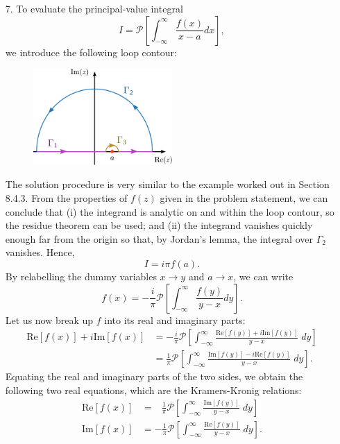 \documentclass[10pt,a4paper]{article}
\begin{document}
\begin{enumerate}
\item[7.]
To evaluate the principal-value integral
\begin{equation}
  I = \mathcal{P}\left[\int_{-\infty}^\infty \frac{f(x)}{x-a} dx \right],
\end{equation}
we introduce the following loop contour:

\begin{figure}[ht]
  \centering\includegraphics[width=0.5\textwidth]{principal_value_integral2}
\end{figure}

The solution procedure is very similar to the example worked out in
Section 8.4.3. From the properties of $f(z)$ given in the problem
statement, we can conclude that (i) the integrand is analytic on and
within the loop contour, so the residue theorem can be used; and (ii)
the integrand vanishes quickly enough far from the origin so that, by
Jordan's lemma, the integral over $\Gamma_2$ vanishes. Hence,
\begin{equation}
  I = i \pi f(a).
\end{equation}
 By relabelling the dummy variables
$x \rightarrow y$ and $a \rightarrow x$, we can write
\begin{equation}
  f(x) = -\frac{i}{\pi} \mathcal{P}\left[\int_{-\infty}^\infty \frac{f(y)}{y-x} dy \right].
\end{equation}
Let us now break up $f$ into its real and imaginary parts:
\begin{align}
  \mathrm{Re}[f(x)] + i \mathrm{Im}[f(x)]
  &= -\frac{i}{\pi} \mathcal{P}\left[\int_{-\infty}^\infty \frac{\mathrm{Re}[f(y)] + i \mathrm{Im}[f(y)]}{y-x} \;dy \right] \\
  &= \frac{1}{\pi} \mathcal{P}\left[\int_{-\infty}^\infty \frac{\mathrm{Im}[f(y)] -i\mathrm{Re}[f(y)]}{y-x} \;dy \right].
\end{align}
Equating the real and imaginary parts of the two sides, we obtain the
following two real equations, which are the Kramers-Kronig relations:
\begin{align}
  \mathrm{Re}[f(x)] &= \;\;\,\frac{1}{\pi} \mathcal{P}\left[\int_{-\infty}^\infty \frac{\mathrm{Im}[f(y)]}{y-x} \;dy \right] \\
  \mathrm{Im}[f(x)] &= -\frac{1}{\pi} \mathcal{P}\left[\int_{-\infty}^\infty \frac{\mathrm{Re}[f(y)]}{y-x} \; dy \right].
\end{align}

\end{enumerate}
\end{document}
